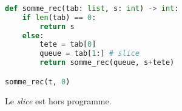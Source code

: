 \documentclass[svgnames,11pt]{beamer}
\begin{document}
\begin{frame}[fragile]
    \frametitle{}

\begin{center}
\begin{lstlisting}[language=Python , basicstyle=\ttfamily\small, xleftmargin=2em, xrightmargin=2em]
def somme_rec(tab: list, s: int) -> int:
    if len(tab) == 0:
        return s
    else:
        tete = tab[0]
        queue = tab[1:] # slice
        return somme_rec(queue, s+tete)

somme_rec(t, 0)
\end{lstlisting}
\end{center}
\begin{aretenir}[Remarque]
Le \emph{slice} est hors programme.
\end{aretenir}
\end{frame}
\end{document}

